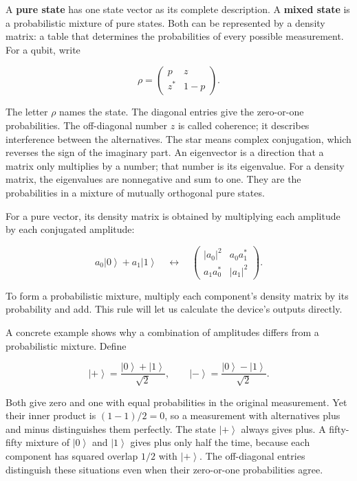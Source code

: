 \documentclass[11pt,letterpaper]{article}
\begin{document}
A \textbf{pure state} has one state vector as its complete description. A \textbf{mixed state} is a probabilistic mixture of pure states. Both can be represented by a density matrix: a table that determines the probabilities of every possible measurement. For a qubit, write

\[\rho = \begin{pmatrix}
p & z \\
z^{*} & 1 - p
\end{pmatrix}.\]

The letter \(\rho\) names the state. The diagonal entries give the zero-or-one probabilities. The off-diagonal number \(z\) is called coherence; it describes interference between the alternatives. The star means complex conjugation, which reverses the sign of the imaginary part. An eigenvector is a direction that a matrix only multiplies by a number; that number is its eigenvalue. For a density matrix, the eigenvalues are nonnegative and sum to one. They are the probabilities in a mixture of mutually orthogonal pure states.

For a pure vector, its density matrix is obtained by multiplying each amplitude by each conjugated amplitude:

\[a_{0}\left| 0 \right\rangle + a_{1}\left| 1 \right\rangle\quad \leftrightarrow \quad\begin{pmatrix}
\left| a_{0} \right|^{2} & a_{0}a_{1}^{*} \\
a_{1}a_{0}^{*} & \left| a_{1} \right|^{2}
\end{pmatrix}.\]

To form a probabilistic mixture, multiply each component's density matrix by its probability and add. This rule will let us calculate the device's outputs directly.

A concrete example shows why a combination of amplitudes differs from a probabilistic mixture. Define

\[\left| + \right\rangle = \frac{\left| 0 \right\rangle + \left| 1 \right\rangle}{\sqrt{2}},\quad\quad\left| - \right\rangle = \frac{\left| 0 \right\rangle - \left| 1 \right\rangle}{\sqrt{2}}.\]

Both give zero and one with equal probabilities in the original measurement. Yet their inner product is \((1 - 1)/2 = 0\), so a measurement with alternatives plus and minus distinguishes them perfectly. The state \(\left| + \right\rangle\) always gives plus. A fifty-fifty mixture of \(\left| 0 \right\rangle\) and \(\left| 1 \right\rangle\) gives plus only half the time, because each component has squared overlap \(1/2\) with \(\left| + \right\rangle\). The off-diagonal entries distinguish these situations even when their zero-or-one probabilities agree.
\end{document}
